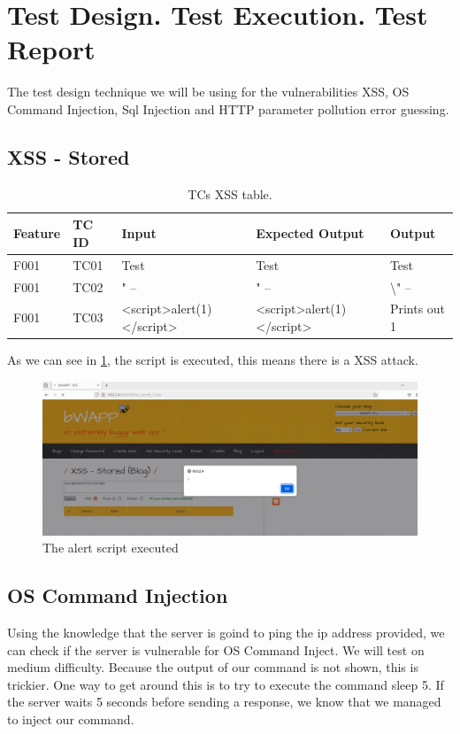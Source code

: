 \documentclass{article}
\begin{document}
\section{Test Design. Test Execution. Test Report}
\label{}
The test design technique we will be using for the vulnerabilities XSS, OS Command Injection, Sql Injection and HTTP parameter pollution error guessing.

\subsection{XSS - Stored}
\begin{table} [htpb]
    \centering
    \begin{tabular}{l|l|l|l|l}
        Feature & TC ID & Input                     & Expected Output           & Output              \\ \hline
        F001    & TC01  & Test                      & Test                      & Test                \\
        F001    & TC02  & " --                      & " --                      & \textbackslash " -- \\
        F001    & TC03  & <script>alert(1)</script> & <script>alert(1)</script> & Prints out 1        \\
    \end{tabular}
    \caption{\label{tab:TC-XSS}TCs XSS table.}
\end{table}

As we can see in \ref{fig:xss-alert}, the script is executed, this means there is a XSS attack.

\begin{figure}
    \centering
    \includegraphics[width=1\linewidth]{Figures/beef/xss-alert.png}
    \caption{\label{fig:xss-alert}The alert script executed}
\end{figure}

\subsection{OS Command Injection}
Using the knowledge that the server is goind to ping the ip address provided, we can check if the server is vulnerable for OS Command Inject.
We will test on medium difficulty.
Because the output of our command is not shown, this is trickier. One way to get around this is to try to execute the command sleep 5.
If the server waits 5 seconds before sending a response, we know that we managed to inject our command.
\end{document}
